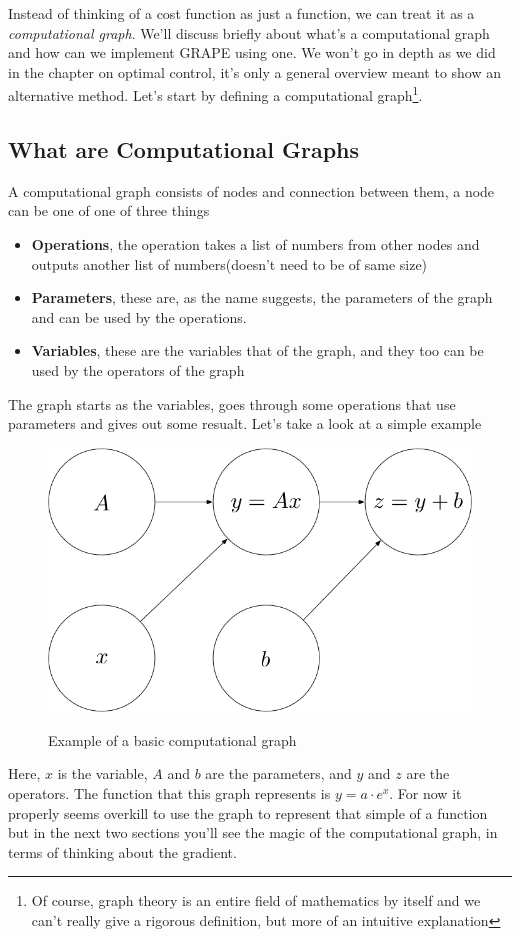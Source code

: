 \documentclass[english, a4paper, 12pt, twoside]{article}
\numberwithin{equation}{section} %
\begin{document}
Instead of thinking of a cost function as just a function, we can treat it as a \textit{computational graph}. We'll discuss briefly about what's a computational graph and how can we implement GRAPE using one. We won't go in depth as we did in the chapter on optimal control, it's only a general overview meant to show an alternative method. Let's start by defining a computational graph\footnote{Of course, graph theory is an entire field of mathematics by itself and we can't really give a rigorous definition, but more of an intuitive explanation}.
\subsection{What are Computational Graphs}
A computational graph consists of nodes and connection between them, a node can be one of one of three things
\begin{itemize}
    \item \textbf{Operations}, the operation takes a list of numbers from other nodes and outputs another list of numbers(doesn't need to be of same size) %
    \item \textbf{Parameters}, these are, as the name suggests, the parameters of the graph and can be used by the operations.
    \item \textbf{Variables}, these are the variables that of the graph, and they too can be used by the operators of the graph
\end{itemize}
The graph starts as the variables, goes through some operations that use parameters and gives out some resualt. Let's take a look at a simple example
\begin{figure}[H]
    \centering
    \caption{Example of a basic computational graph}
    \includegraphics[width=0.4\columnwidth]{Example-comp-graph.png} %
    \label{fig:example-computational-graph}
\end{figure}

Here, $x$ is the variable, $A$ and $b$ are the parameters, and $y$ and $z$ are the operators. The function that this graph represents is $y = a \cdot e^{x}$. For now it properly seems overkill to use the graph to represent that simple of a function but in the next two sections you'll see the magic of the computational graph, in terms of thinking about the gradient.
\end{document}
